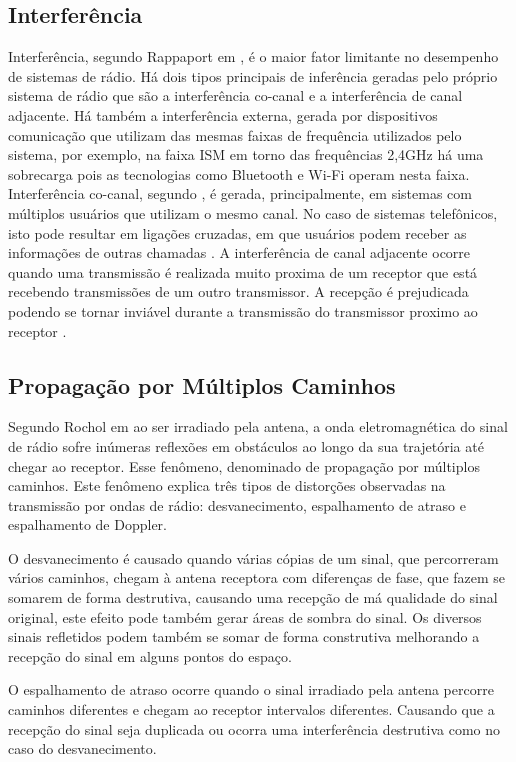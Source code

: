 \subsection*{Interferência}
Interferência, segundo Rappaport em \cite{rappaport2009}, é o maior fator limitante no desempenho de sistemas de rádio. Há dois tipos principais de inferência geradas pelo próprio sistema de rádio que são a interferência co-canal e a interferência de canal adjacente. Há também a interferência externa, gerada por dispositivos comunicação que utilizam das mesmas faixas de frequência utilizados pelo sistema, por exemplo, na faixa ISM em torno das frequências 2,4GHz há uma sobrecarga pois as tecnologias como Bluetooth e Wi-Fi operam nesta faixa. Interferência co-canal, segundo \cite{rochol2018sistemas}, é gerada, principalmente, em sistemas com múltiplos usuários que utilizam o mesmo canal. No caso de sistemas telefônicos, isto pode resultar em ligações cruzadas, em que usuários podem receber as informações de outras chamadas \cite{rappaport2009}. A interferência de canal adjacente ocorre quando uma transmissão é realizada muito proxima de um receptor que está recebendo transmissões de um outro transmissor. A recepção é prejudicada podendo se tornar inviável durante a transmissão do transmissor proximo ao receptor \cite{rappaport2009}.


\subsection*{Propagação por Múltiplos Caminhos}
Segundo Rochol em \cite{rochol2018sistemas} ao ser irradiado pela antena, a onda eletromagnética do sinal de rádio sofre inúmeras reflexões em obstáculos ao longo da sua trajetória até chegar ao receptor. Esse fenômeno, denominado de propagação por múltiplos caminhos. Este fenômeno explica três tipos de distorções observadas na transmissão por ondas de rádio: desvanecimento, espalhamento de atraso e espalhamento de Doppler.

O desvanecimento é causado quando várias cópias de um sinal, que percorreram vários caminhos, chegam à antena receptora com diferenças de fase, que fazem se somarem de forma destrutiva, causando uma recepção de má qualidade do sinal original, este efeito pode também gerar áreas de sombra do sinal. Os diversos sinais refletidos podem também se somar de forma construtiva melhorando a recepção do sinal em alguns pontos do espaço.

O espalhamento de atraso ocorre quando o sinal irradiado pela antena percorre caminhos diferentes e chegam ao receptor intervalos diferentes. Causando que a recepção do sinal seja duplicada ou ocorra uma interferência destrutiva como no caso do desvanecimento.

